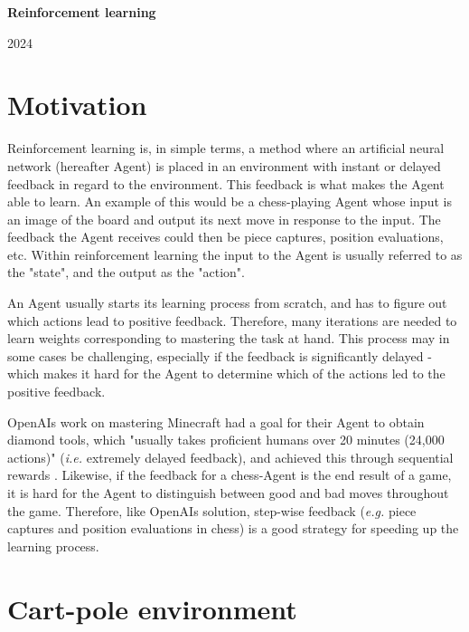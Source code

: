 \documentclass{article}
\begin{document}
\begin{center}
    \textbf{\LARGE Reinforcement learning}

    \vspace{0.2cm}
    
    2024

\end{center}

\section*{Motivation}

Reinforcement learning is, in simple terms, a method where an artificial neural network (hereafter Agent) is placed in an environment with instant or delayed feedback in regard to the environment. This feedback is what makes the Agent able to learn. An example of this would be a chess-playing Agent whose input is an image of the board and output its next move in response to the input. The feedback the Agent receives could then be piece captures, position evaluations, etc. Within reinforcement learning the input to the Agent is usually referred to as the "state", and the output as the "action".

An Agent usually starts its learning process from scratch, and has to figure out which actions lead to positive feedback. Therefore, many iterations are needed to learn weights corresponding to mastering the task at hand. This process may in some cases be challenging, especially if the feedback is significantly delayed - which makes it hard for the Agent to determine which of the actions led to the positive feedback.

OpenAIs work on mastering Minecraft had a goal for their Agent to obtain diamond tools, which "usually takes proficient humans over 20 minutes (24,000 actions)" (\textit{i.e.} extremely delayed feedback), and achieved this through sequential rewards \cite{Minecraft}. Likewise, if the feedback for a chess-Agent is the end result of a game, it is hard for the Agent to distinguish between good and bad moves throughout the game. Therefore, like OpenAIs solution, step-wise feedback (\textit{e.g.} piece captures and position evaluations in chess) is a good strategy for speeding up the learning process.

\section*{Cart-pole environment}
\end{document}
